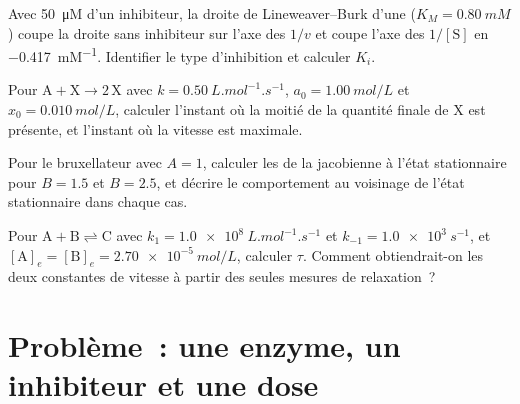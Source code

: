 \begin{exercise}[$\star\star$]\label{exo:b3:complex-kinetics:9}
Avec \qty{50}{\micro M} d'un inhibiteur, la droite de Lineweaver--Burk
d'une 
($K_M = \qty{0.80}{mM}$) coupe la droite sans inhibiteur sur l'axe des
$1/v$ et coupe l'axe des
$1/[\mathrm S]$ en \qty{-0.417}{mM^{-1}}. Identifier le type d'inhibition
et calculer $K_i$.
\end{exercise}

\begin{exercise}[$\star\star\star$]\label{exo:b3:complex-kinetics:10}
Pour $\mathrm{A + X \to 2\,X}$ avec $k = \qty{0.50}{L.mol^{-1}.s^{-1}}$, $a_0 = \qty{1.00}{mol/L}$ et $x_0 = \qty{0.010}{mol/L}$,
calculer l'instant où la moitié de la quantité finale de X est présente,
et l'instant où la vitesse est maximale.
\end{exercise}

\begin{exercise}[$\star\star\star$]\label{exo:b3:complex-kinetics:11}
Pour le bruxellateur avec $A = 1$, calculer les  de la
jacobienne à l'état stationnaire pour $B = 1.5$ et $B = 2.5$, et décrire
le comportement au voisinage de l'état stationnaire dans chaque cas.
\end{exercise}

\begin{exercise}[$\star\star\star$]\label{exo:b3:complex-kinetics:12}
Pour $\mathrm{A + B \rightleftharpoons C}$ avec $k_1 = \qty{1.0e8}{L.mol^{-1}.s^{-1}}$ et $k_{-1} = \qty{1.0e3}{s^{-1}}$, et
$[\mathrm A]_e = [\mathrm B]_e = \qty{2.70e-5}{mol/L}$, calculer $\tau$.
Comment obtiendrait-on les deux constantes de vitesse à partir des seules
mesures de relaxation~?
\end{exercise}

\section{Problème~: une enzyme, un inhibiteur et une dose}


